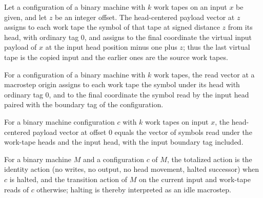 \begin{definition}
\label{Complexity.sourcePayload}
\leanok
{}
Let a configuration of a binary machine with $k$ work tapes on an input $x$ be given,
and let $z$ be an integer offset.  The head-centered payload vector at $z$ assigns to
each work tape the symbol of that tape at signed distance $z$ from its head, with
ordinary tag $0$, and assigns to the final coordinate the virtual input payload of $x$
at the input head position minus one plus $z$; thus the last virtual tape is the
copied input and the earlier ones are the source work tapes.
\end{definition}

\begin{definition}
\label{Complexity.sourceReads}
\leanok
{}
For a configuration of a binary machine with $k$ work tapes, the read vector at a
macrostep origin assigns to each work tape the symbol under its head with ordinary tag
$0$, and to the final coordinate the symbol read by the input head paired with the
boundary tag of the configuration.
\end{definition}

\begin{lemma}
\label{Complexity.sourcePayload_origin}
\leanok
{}
For a binary machine configuration $c$ with $k$ work tapes on input $x$, the
head-centered payload vector at offset $0$ equals the vector of symbols read under the
work-tape heads and the input head, with the input boundary tag included.
\end{lemma}

\begin{definition}
\label{Complexity.sourceTotalAction}
\leanok
{}
For a binary machine $M$ and a configuration $c$ of $M$, the totalized action is the
identity action (no writes, no output, no head movement, halted successor) when $c$ is
halted, and the transition action of $M$ on the current input and work-tape reads of
$c$ otherwise; halting is thereby interpreted as an idle macrostep.
\end{definition}

